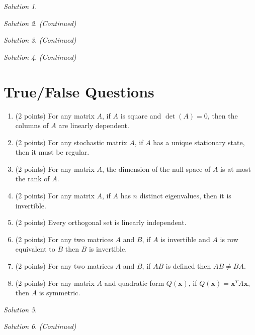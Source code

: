 \documentclass{article}
\theoremstyle{remark} \newtheorem*{solution}{Solution}
\newcommand{\vv}[1]{\mathbf{#1}} \newcommand{\R}{\mathbb R}
\begin{document}
\begin{solution}
\end{solution}

\pagebreak
\begin{solution}
  \textit{(Continued)}
\end{solution}

\pagebreak
\begin{solution}
  \textit{(Continued)}
\end{solution}

\pagebreak
\begin{solution}
  \textit{(Continued)}
\end{solution}

\pagebreak
\section{True/False Questions}

\begin{enumerate}
\item (2 points) For any matrix $A$, if $A$ is square and $\det(A) =
  0$, then the columns of $A$ are linearly dependent.
\item (2 points) For any stochastic matrix $A$, if $A$ has a unique
  stationary state, then it must be regular.
\item (2 points) For any matrix $A$, the dimension of the null space
  of $A$ is at most the rank of $A$.
\item (2 points) For any matrix $A$, if $A$ has $n$ distinct
  eigenvalues, then it is invertible.
\item (2 points) Every orthogonal set is linearly independent.
\item (2 points) For any two matrices $A$ and $B$, if $A$ is
  invertible and $A$ is row equivalent to $B$ then $B$ is invertible.
\item (2 points) For any two matrices $A$ and $B$, if $AB$ is defined
  then $AB \not = BA$.
\item (2 points) For any matrix $A$ and quadratic form $Q(\vv x)$, if
  $Q(\vv x) = \vv x^TA\vv x$, then $A$ is symmetric.
\end{enumerate}

\medskip

\begin{solution}
\end{solution}

\pagebreak
\begin{solution}
  \textit{(Continued)}
\end{solution}
\end{document}
